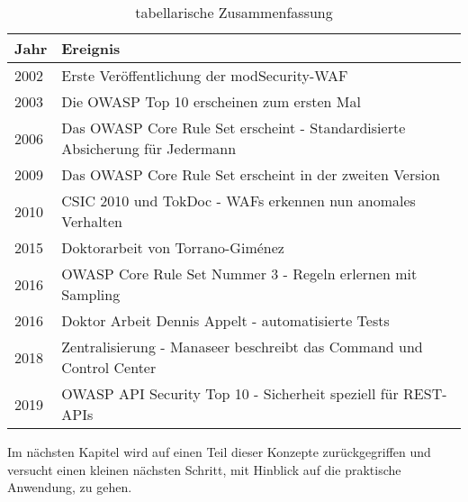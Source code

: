 \begin{table}[h!]
    \centering
 
\begin{tabular}{lp{9cm}}
  \toprule
  Jahr & Ereignis\\
  \midrule
  2002 & Erste Veröffentlichung der modSecurity-WAF \\
  2003 & Die OWASP Top 10 erscheinen zum ersten Mal\\
  2006 & Das OWASP Core Rule Set erscheint - Standardisierte Absicherung für Jedermann \\
  2009 & Das OWASP Core Rule Set erscheint in der zweiten Version \\
  2010 & CSIC 2010 und TokDoc - WAFs erkennen nun anomales Verhalten \\
  2015 & Doktorarbeit von Torrano-Giménez \\
  2016 & OWASP Core Rule Set Nummer 3 - Regeln erlernen mit Sampling \\
  2016 & Doktor Arbeit Dennis Appelt - automatisierte Tests \\
  2018 & Zentralisierung - Manaseer beschreibt das Command und Control Center\\
  2019 & OWASP API Security Top 10 - Sicherheit speziell für REST-APIs\\
  \bottomrule
\end{tabular}
\caption{tabellarische Zusammenfassung}
\label{tab:zeitstrahl}
\end{table}

Im nächsten Kapitel wird auf einen Teil dieser Konzepte zurückgegriffen und versucht einen kleinen nächsten Schritt, mit Hinblick auf die praktische Anwendung, zu gehen.

